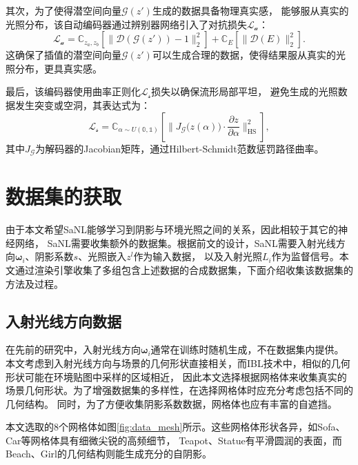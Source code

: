  其次，为了使得潜空间向量$\mathcal{G}\left(z'\right)$生成的数据具备物理真实感，
  能够服从真实的光照分布，该自动编码器通过辨别器网络引入了对抗损失$\mathcal{L}_{\mathcal{a}}$：
  \begin{equation}
  \label{eq:adversarial_loss}
  \mathcal{L}_{\mathcal{a}}=\mathbb{C}_{z_a,z_b}\left[\|\mathcal{D}\left(\mathcal{G}\left(z'\right)\right)-1\|_2^2\right]+\mathbb{C}_E\left[\|\mathcal{D}\left(E\right)\|_2^2\right].
  \end{equation}
  这确保了插值的潜空间向量$\mathcal{G}\left(z'\right)$可以生成合理的数据，使得结果服从真实的光照分布，更具真实感。
  
  最后，该编码器使用曲率正则化$\mathcal{L}_{\mathcal{s}}$损失以确保流形局部平坦，
  避免生成的光照数据发生突变或空洞，其表达式为：
  \begin{equation}
  \label{eq:curvature_loss}
  \mathcal{L}_{\mathcal{s}}=\mathbb{C}_{\alpha\sim U\left(\mathbb{0},\mathbb{1}\right)}\left[\|J_{\mathcal{G}}\bigl(z(\alpha)\bigr)\cdot\frac{\partial z}{\partial\alpha}\|_{\mathrm{HS}}^2\right],
  \end{equation}
  其中$J_{\mathcal{G}}$为解码器的Jacobian矩阵，通过Hilbert-Schmidt范数惩罚路径曲率。

\section{数据集的获取}

由于本文希望SaNL能够学习到阴影与环境光照之间的关系，因此相较于其它的神经网络，
SaNL需要收集额外的数据集。根据前文的设计，SaNL需要入射光线方向${\boldsymbol{\omega}}_i$、阴影系数$s$、光照嵌入$z^l$作为输入数据，
以及入射光照$L_i$作为监督信号。本文通过渲染引擎收集了多组包含上述数据的合成数据集，下面介绍收集该数据集的方法及过程。

\subsection{入射光线方向数据}

在先前的研究中，入射光线方向${\boldsymbol{\omega}}_i$通常在训练时随机生成，不在数据集内提供。
本文考虑到入射光线方向与场景的几何形状直接相关，而IBL技术中，相似的几何形状可能在环境贴图中采样的区域相近，
因此本文选择根据网格体来收集真实的场景几何形状。为了增强数据集的多样性，在选择网格体时应充分考虑包括不同的几何结构。
同时，为了方便收集阴影系数数据，网格体也应有丰富的自遮挡。

本文选取的8个网格体如图\ref{fig:data_mesh}所示。这些网格体形状各异，如Sofa、Car等网格体具有细微尖锐的高频细节，
Teapot、Statue有平滑圆润的表面，而Beach、Girl的几何结构则能生成充分的自阴影。

